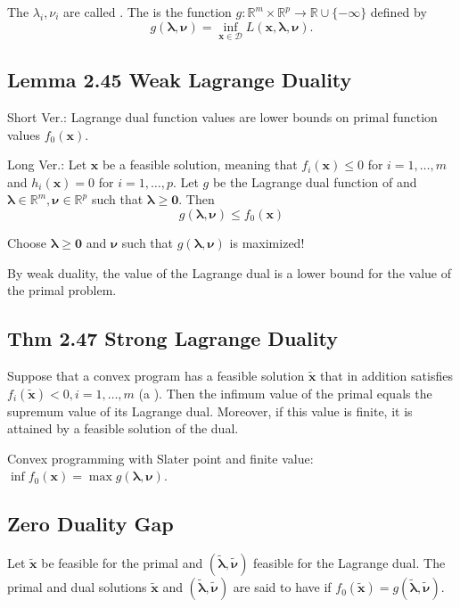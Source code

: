 The $\lambda_{i}, \nu_{i}$ are called .
The  is the function $g: \mathbb{R}^{m} \times \mathbb{R}^{p} \rightarrow \mathbb{R} \cup\{-\infty\}$ defined by
$$
g(\boldsymbol{\lambda}, \boldsymbol{\nu})=\inf _{\mathbf{x} \in \mathcal{D}} L(\mathbf{x}, \boldsymbol{\lambda}, \boldsymbol{\nu}) .
$$

\subsection*{Lemma 2.45 Weak Lagrange Duality}
Short Ver.: Lagrange dual function values are lower bounds on primal function values $f_{0}(\mathbf{x})$.

Long Ver.: Let $\mathbf{x}$ be a feasible solution, meaning that $f_{i}(\mathbf{x}) \leq 0$ for $i=1, \ldots, m$ and $h_{i}(\mathbf{x})=0$ for $i=1, \ldots, p$. Let $g$ be the Lagrange dual function of and $\boldsymbol{\lambda} \in \mathbb{R}^{m}, \boldsymbol{\nu} \in \mathbb{R}^{p}$ such that $\boldsymbol{\lambda} \geq \mathbf{0}$. Then
$$
g(\boldsymbol{\lambda}, \boldsymbol{\nu}) \leq f_{0}(\mathbf{x})
$$

Choose $\boldsymbol{\lambda} \geq \mathbf{0}$ and $\boldsymbol{\nu}$ such that $g(\boldsymbol{\lambda}, \boldsymbol{\nu})$ is maximized!

By weak duality, the  value of the Lagrange dual is a lower bound for the
 value of the primal problem.

\subsection*{Thm 2.47 Strong Lagrange Duality}
Suppose that a convex program has a feasible solution $\tilde{\mathbf{x}}$ that in addition satisfies $f_{i}(\tilde{\mathbf{x}})<0, i=1, \ldots, m$ (a ). Then the infimum value of the primal equals the supremum value of its Lagrange dual. Moreover, if this value is finite, it is attained by a feasible solution of the dual.

Convex programming with Slater point and finite value: $\inf f_{0}(\mathbf{x})=\max g(\boldsymbol{\lambda}, \boldsymbol{\nu})$.

\subsection*{Zero Duality Gap}
Let $\tilde{\mathbf{x}}$ be feasible for the primal and $(\tilde{\boldsymbol{\lambda}}, \tilde{\boldsymbol{\nu}})$ feasible for the Lagrange dual. The primal and dual solutions $\tilde{\mathbf{x}}$ and $(\tilde{\boldsymbol{\lambda}}, \tilde{\boldsymbol{\nu}})$ are said to have  if $f_{0}(\tilde{\mathbf{x}})=g(\tilde{\boldsymbol{\lambda}}, \tilde{\boldsymbol{\nu}})$.

